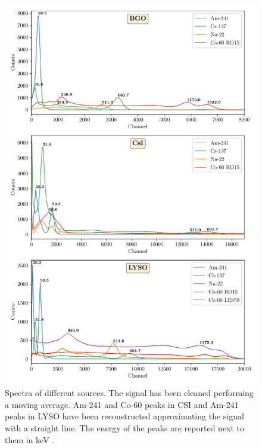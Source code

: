 \documentclass[a4paper, 11pt, table]{article}
\begin{document}
\begin{figure}[H]
    \centering
    \includegraphics[height=0.9\textheight]{figures/spectra.pdf}
    \caption{Spectra of different sources. The signal has been cleaned performing a moving average. Am-241 and Co-60 peaks in CSI and Am-241 peaks in LYSO have been reconstructed approximating the signal with a straight line. The energy of the peaks are reported next to them in keV \cite{heath_scintillation_1964}.}
    \label{fig:spectra}
\end{figure}
\end{document}
